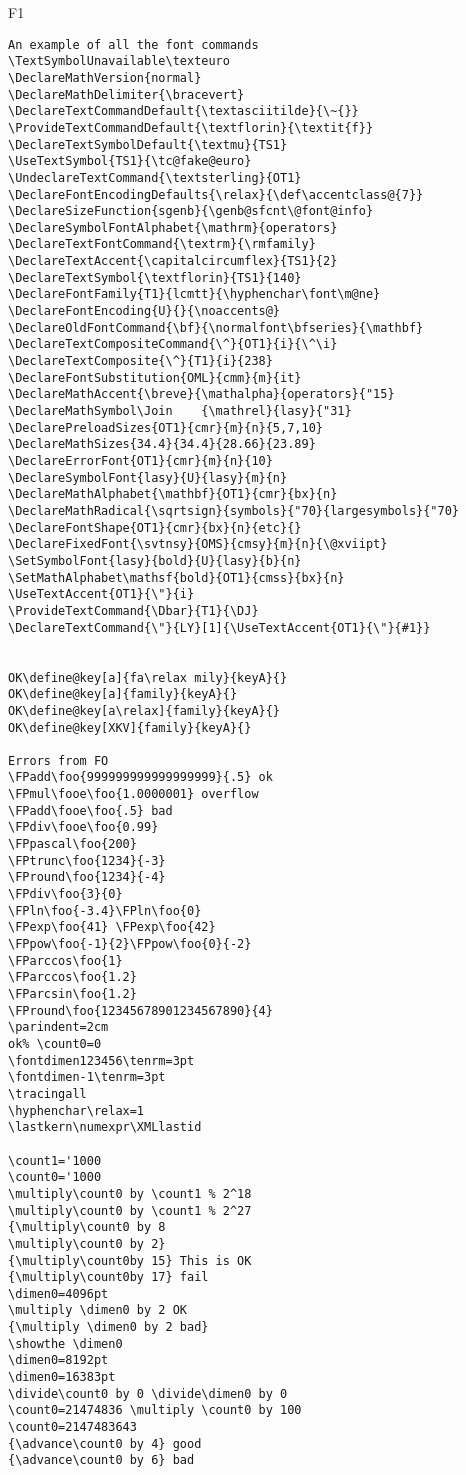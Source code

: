 \documentclass{article}
\begin{document}
\begin{filecontents+}{F1}
\begin{Verbatim}
An example of all the font commands
\TextSymbolUnavailable\texteuro
\DeclareMathVersion{normal}
\DeclareMathDelimiter{\bracevert}
\DeclareTextCommandDefault{\textasciitilde}{\~{}}
\ProvideTextCommandDefault{\textflorin}{\textit{f}}
\DeclareTextSymbolDefault{\textmu}{TS1}
\UseTextSymbol{TS1}{\tc@fake@euro}
\UndeclareTextCommand{\textsterling}{OT1}
\DeclareFontEncodingDefaults{\relax}{\def\accentclass@{7}}
\DeclareSizeFunction{sgenb}{\genb@sfcnt\@font@info}
\DeclareSymbolFontAlphabet{\mathrm}{operators}
\DeclareTextFontCommand{\textrm}{\rmfamily}
\DeclareTextAccent{\capitalcircumflex}{TS1}{2}
\DeclareTextSymbol{\textflorin}{TS1}{140}
\DeclareFontFamily{T1}{lcmtt}{\hyphenchar\font\m@ne}
\DeclareFontEncoding{U}{}{\noaccents@}
\DeclareOldFontCommand{\bf}{\normalfont\bfseries}{\mathbf}
\DeclareTextCompositeCommand{\^}{OT1}{i}{\^\i}
\DeclareTextComposite{\^}{T1}{i}{238}
\DeclareFontSubstitution{OML}{cmm}{m}{it}
\DeclareMathAccent{\breve}{\mathalpha}{operators}{"15}
\DeclareMathSymbol\Join    {\mathrel}{lasy}{"31}
\DeclarePreloadSizes{OT1}{cmr}{m}{n}{5,7,10}
\DeclareMathSizes{34.4}{34.4}{28.66}{23.89}
\DeclareErrorFont{OT1}{cmr}{m}{n}{10} 
\DeclareSymbolFont{lasy}{U}{lasy}{m}{n}
\DeclareMathAlphabet{\mathbf}{OT1}{cmr}{bx}{n}
\DeclareMathRadical{\sqrtsign}{symbols}{"70}{largesymbols}{"70}
\DeclareFontShape{OT1}{cmr}{bx}{n}{etc}{}
\DeclareFixedFont{\svtnsy}{OMS}{cmsy}{m}{n}{\@xviipt}
\SetSymbolFont{lasy}{bold}{U}{lasy}{b}{n}
\SetMathAlphabet\mathsf{bold}{OT1}{cmss}{bx}{n}
\UseTextAccent{OT1}{\"}{i}
\ProvideTextCommand{\Dbar}{T1}{\DJ}
\DeclareTextCommand{\"}{LY}[1]{\UseTextAccent{OT1}{\"}{#1}}


OK\define@key[a]{fa\relax mily}{keyA}{}
OK\define@key[a]{family}{keyA}{}
OK\define@key[a\relax]{family}{keyA}{}
OK\define@key[XKV]{family}{keyA}{}

Errors from FO
\FPadd\foo{999999999999999999}{.5} ok
\FPmul\fooe\foo{1.0000001} overflow
\FPadd\fooe\foo{.5} bad
\FPdiv\fooe\foo{0.99} 
\FPpascal\foo{200}
\FPtrunc\foo{1234}{-3}
\FPround\foo{1234}{-4}
\FPdiv\foo{3}{0}
\FPln\foo{-3.4}\FPln\foo{0}
\FPexp\foo{41} \FPexp\foo{42}
\FPpow\foo{-1}{2}\FPpow\foo{0}{-2}
\FParccos\foo{1}
\FParccos\foo{1.2}
\FParcsin\foo{1.2}
\FPround\foo{12345678901234567890}{4}
\parindent=2cm
ok% \count0=0
\fontdimen123456\tenrm=3pt
\fontdimen-1\tenrm=3pt
\tracingall
\hyphenchar\relax=1
\lastkern\numexpr\XMLlastid

\count1='1000 
\count0='1000
\multiply\count0 by \count1 % 2^18
\multiply\count0 by \count1 % 2^27
{\multiply\count0 by 8 
\multiply\count0 by 2}
{\multiply\count0by 15} This is OK
{\multiply\count0by 17} fail
\dimen0=4096pt
\multiply \dimen0 by 2 OK
{\multiply \dimen0 by 2 bad}
\showthe \dimen0
\dimen0=8192pt
\dimen0=16383pt
\divide\count0 by 0 \divide\dimen0 by 0
\count0=21474836 \multiply \count0 by 100
\count0=2147483643
{\advance\count0 by 4} good
{\advance\count0 by 6} bad


\end{Verbatim}
\end{filecontents+}
\end{document}
